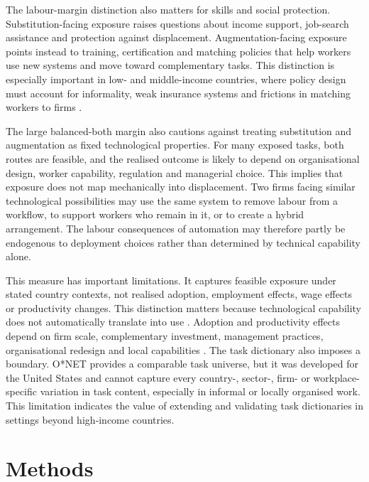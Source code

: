 \documentclass[11pt]{article}
\begin{document}
The labour-margin distinction also matters for skills and social protection. Substitution-facing exposure raises questions about income support, job-search assistance and protection against displacement. Augmentation-facing exposure points instead to training, certification and matching policies that help workers use new systems and move toward complementary tasks. This distinction is especially important in low- and middle-income countries, where policy design must account for informality, weak insurance systems and frictions in matching workers to firms \citep{oecd2018_automation_training,LassebieQuintini2022,AbebeCariaEtAl2020JobSearch,Freeman2010LaborRegulations,BanerjeeHannaOlkenLisker2024SocialProtection}.

The large balanced-both margin also cautions against treating substitution and augmentation as fixed technological properties. For many exposed tasks, both routes are feasible, and the realised outcome is likely to depend on organisational design, worker capability, regulation and managerial choice. This implies that exposure does not map mechanically into displacement. Two firms facing similar technological possibilities may use the same system to remove labour from a workflow, to support workers who remain in it, or to create a hybrid arrangement. The labour consequences of automation may therefore partly be endogenous to deployment choices rather than determined by technical capability alone.

This measure has important limitations. It captures feasible exposure under stated country contexts, not realised adoption, employment effects, wage effects or productivity changes. This distinction matters because technological capability does not automatically translate into use \citep{SvanbergLiFlemingGoehringThompson2024,FlemingLiThompson2024LastMileAI,McElheranEtAl2023AIAdoptionAmerica}. Adoption and productivity effects depend on firm scale, complementary investment, management practices, organisational redesign and local capabilities \citep{BresnahanBrynjolfssonHitt2002,BloomVanReenen2007,CireraCominCruz2024}. The task dictionary also imposes a boundary. O*NET provides a comparable task universe, but it was developed for the United States and cannot capture every country-, sector-, firm- or workplace-specific variation in task content, especially in informal or locally organised work. This limitation indicates the value of extending and validating task dictionaries in settings beyond high‑income countries.

\section{Methods}
\label{sec:data_measurement}
\end{document}

